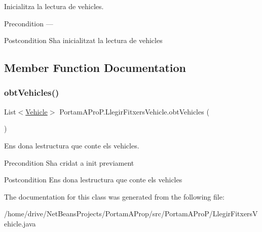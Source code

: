 Inicialitza la lectura de vehicles. 

\begin{DoxyPrecond}{Precondition}
--- 
\end{DoxyPrecond}
\begin{DoxyPostcond}{Postcondition}
S\textquotesingle{}ha inicialitzat la lectura de vehicles 
\end{DoxyPostcond}


\subsection{Member Function Documentation}
\mbox{\label{class_portam_a_pro_p_1_1_llegir_fitxers_vehicle_ad64213b0f95e08a0c2709e44d807ed63}} 
\subsubsection{\texorpdfstring{obt\+Vehicles()}{obtVehicles()}}
{\footnotesize\ttfamily List$<$\hyperlink{class_portam_a_pro_p_1_1_vehicle}{Vehicle}$>$ Portam\+A\+Pro\+P.\+Llegir\+Fitxers\+Vehicle.\+obt\+Vehicles (\begin{DoxyParamCaption}{ }\end{DoxyParamCaption})}



Ens dona l\textquotesingle{}estructura que conte els vehicles. 

\begin{DoxyPrecond}{Precondition}
S\textquotesingle{}ha cridat a init previament 
\end{DoxyPrecond}
\begin{DoxyPostcond}{Postcondition}
Ens dona l\textquotesingle{}estructura que conte els vehicles 
\end{DoxyPostcond}


The documentation for this class was generated from the following file\+:\begin{DoxyCompactItemize}
\item 
/home/drive/\+Net\+Beans\+Projects/\+Portam\+A\+Prop/src/\+Portam\+A\+Pro\+P/Llegir\+Fitxers\+Vehicle.\+java\end{DoxyCompactItemize}
